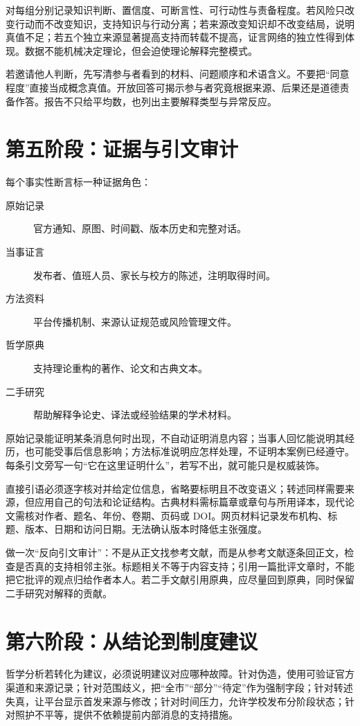 对每组分别记录知识判断、置信度、可断言性、可行动性与责备程度。若风险只改变行动而不改变知识，支持知识与行动分离；若来源改变知识却不改变结局，说明真值不足；若五个独立来源显著提高支持而转载不提高，证言网络的独立性得到体现。数据不能机械决定理论，但会迫使理论解释完整模式。

若邀请他人判断，先写清参与者看到的材料、问题顺序和术语含义。不要把“同意程度”直接当成概念真值。开放回答可揭示参与者究竟根据来源、后果还是道德责备作答。报告不只给平均数，也列出主要解释类型与异常反应。

\section{第五阶段：证据与引文审计}

每个事实性断言标一种证据角色：

\begin{description}
\item[原始记录] 官方通知、原图、时间戳、版本历史和完整对话。
\item[当事证言] 发布者、值班人员、家长与校方的陈述，注明取得时间。
\item[方法资料] 平台传播机制、来源认证规范或风险管理文件。
\item[哲学原典] 支持理论重构的著作、论文和古典文本。
\item[二手研究] 帮助解释争论史、译法或经验结果的学术材料。
\end{description}

原始记录能证明某条消息何时出现，不自动证明消息内容；当事人回忆能说明其经历，也可能受事后信息影响；方法标准说明应怎样处理，不证明本案例已经遵守。每条引文旁写一句“它在这里证明什么”，若写不出，就可能只是权威装饰。

直接引语必须逐字核对并给定位信息，省略要标明且不改变语义；转述同样需要来源，但应用自己的句法和论证结构。古典材料需标篇章或章句与所用译本，现代论文需核对作者、题名、年份、卷期、页码或 DOI。网页材料记录发布机构、标题、版本、日期和访问日期。无法确认版本时降低主张强度。

做一次“反向引文审计”：不是从正文找参考文献，而是从参考文献逐条回正文，检查是否真的支持相邻主张。标题相关不等于内容支持；引用一篇批评文章时，不能把它批评的观点归给作者本人。若二手文献引用原典，应尽量回到原典，同时保留二手研究对解释的贡献。

\section{第六阶段：从结论到制度建议}

哲学分析若转化为建议，必须说明建议对应哪种故障。针对伪造，使用可验证官方渠道和来源记录；针对范围歧义，把“全市”“部分”“待定”作为强制字段；针对转述失真，让平台显示首发来源与修改；针对时间压力，允许学校发布分阶段状态；针对照护不平等，提供不依赖提前内部消息的支持措施。

